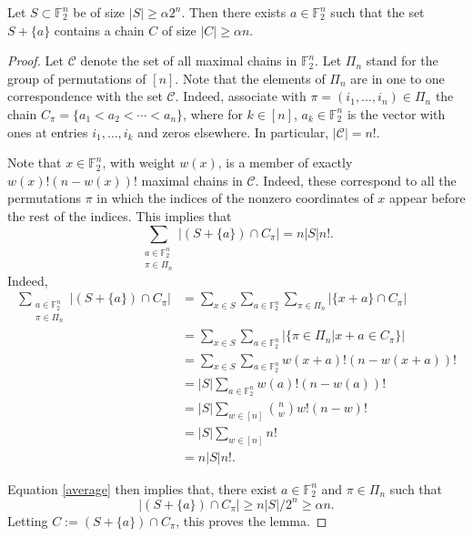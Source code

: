 \documentclass[10pt,a4paper]{amsart}
\begin{document}
\begin{lem}\label{lem:pigeonhole}
Let $S\subset \mathbb{F}_2^n$ be of size $|S|\ge \alpha 2^n$.
Then there exists $a\in \mathbb{F}_2^n$ such that the set $S+\{a\}$  contains a chain  $C$ of size $|C|\ge \alpha n$.
\end{lem}

\begin{proof}
Let $\mathcal{C}$ denote the set of all maximal chains in $\mathbb{F}_2^n$. Let $\Pi_n$ stand for the group of permutations of $[n]$. 
Note that the elements of $\Pi_n$ are in one to one correspondence with the set $\mathcal{C}$. Indeed, associate with $\pi=(i_1,\ldots,i_n)\in \Pi_n$ the chain $C_\pi=\{a_1<a_2<\cdots<a_n\}$, where for $k\in [n]$, $a_k\in\mathbb{F}_2^n$ is the vector with ones at entries $i_1,\ldots,i_k$ and zeros elsewhere. In particular, $|\mathcal{C}|=n!$.

Note that $x\in \mathbb{F}_2^n$, with weight $w(x)$, is a member of exactly $w(x)!(n-w(x))!$ maximal chains in $\mathcal{C}$. Indeed, these correspond to all the permutations $\pi$  in which the indices of the nonzero coordinates of $x$ appear before the rest of the indices. 
This implies that 
\begin{equation}\label{average}
    \sum_{\substack{a\in \mathbb{F}_2^n\\\pi\in \Pi_n}}
\left | (S+\{a\}) \cap C_\pi\right | =n|S|n!.
\end{equation}
Indeed,
\begin{align*}
\sum_{\substack{a\in \mathbb{F}_2^n\\\pi\in \Pi_n}}
\left | (S+\{a\}) \cap C_\pi\right | &=
\sum_{x\in S}
\sum_{ a\in \mathbb{F}_2^n}
\sum_{\pi\in\Pi_n}
\left | \{x+a\} \cap C_\pi\right | \\
&= 
\sum_{x\in S}\sum_{ a\in \mathbb{F}_2^n}
\left | \{\pi\in\Pi_n |x+a\in C_\pi\}\right |\\
&=
\sum_{x\in S}\sum_{ a\in \mathbb{F}_2^n}
w(x+a)!(n-w(x+a))! \\
&=
|S|\sum_{ a\in \mathbb{F}_2^n}
w(a)!(n-w(a))! \\
&= 
|S|
\sum_{ w\in[n]}
\binom{n}{w}w!(n-w)!\\
&= 
|S|
\sum_{ w\in[n]}n!\\
&=n|S|n!.
\end{align*}

Equation \eqref{average} then implies that, there exist $a\in \mathbb{F}_2^n$ and $\pi\in\Pi_n$ such that 
$$
|(S+\{a\})\cap C_\pi|
\ge
n|S|/2^n\ge \alpha n.
$$
Letting $C:=(S+\{a\})\cap C_\pi$, this proves the lemma. 
\end{proof}
\end{document}
